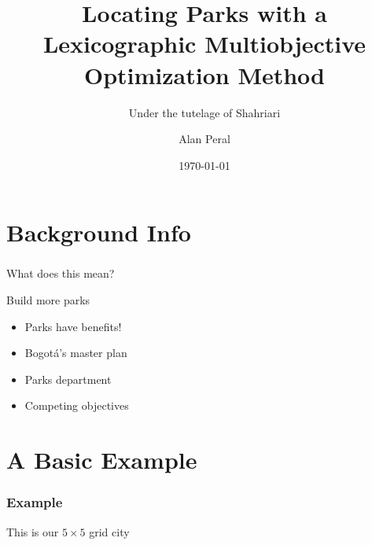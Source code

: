 \documentclass[10pt, compress]{beamer}
\title{Locating Parks with a Lexicographic Multiobjective Optimization Method}
\subtitle{Under the tutelage of Shahriari}
\date{\today}
\author{Alan Peral}
\institute{Pomona College}
\begin{document}
\maketitle
\section{Background Info}
\begin{frame}[fragile]
  \frametitle{}

	\begin{block}{What does this mean?}
	\end{block}

\end{frame}

\begin{frame}{Build more parks}

  \begin{itemize}[<+- | alert@+>]
    \item Parks have benefits!
    \item Bogot\'{a}'s master plan
    \item Parks department 
    \item Competing objectives 
   \end{itemize}
\end{frame}




\section{A Basic Example}
\begin{frame}[fragile]
  \frametitle{Example}
  \begin{center}
 \end{center}
This is our $5\times5$ grid city

\end{frame}
\end{document}
